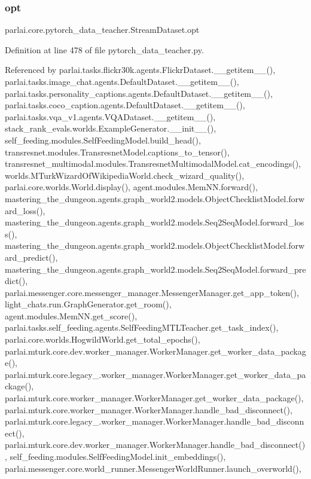 \subsubsection{\texorpdfstring{opt}{opt}}
{\footnotesize\ttfamily parlai.\+core.\+pytorch\+\_\+data\+\_\+teacher.\+Stream\+Dataset.\+opt}



Definition at line 478 of file pytorch\+\_\+data\+\_\+teacher.\+py.



Referenced by parlai.\+tasks.\+flickr30k.\+agents.\+Flickr\+Dataset.\+\_\+\+\_\+getitem\+\_\+\+\_\+(), parlai.\+tasks.\+image\+\_\+chat.\+agents.\+Default\+Dataset.\+\_\+\+\_\+getitem\+\_\+\+\_\+(), parlai.\+tasks.\+personality\+\_\+captions.\+agents.\+Default\+Dataset.\+\_\+\+\_\+getitem\+\_\+\+\_\+(), parlai.\+tasks.\+coco\+\_\+caption.\+agents.\+Default\+Dataset.\+\_\+\+\_\+getitem\+\_\+\+\_\+(), parlai.\+tasks.\+vqa\+\_\+v1.\+agents.\+V\+Q\+A\+Dataset.\+\_\+\+\_\+getitem\+\_\+\+\_\+(), stack\+\_\+rank\+\_\+evals.\+worlds.\+Example\+Generator.\+\_\+\+\_\+init\+\_\+\+\_\+(), self\+\_\+feeding.\+modules.\+Self\+Feeding\+Model.\+build\+\_\+head(), transresnet.\+modules.\+Transresnet\+Model.\+captions\+\_\+to\+\_\+tensor(), transresnet\+\_\+multimodal.\+modules.\+Transresnet\+Multimodal\+Model.\+cat\+\_\+encodings(), worlds.\+M\+Turk\+Wizard\+Of\+Wikipedia\+World.\+check\+\_\+wizard\+\_\+quality(), parlai.\+core.\+worlds.\+World.\+display(), agent.\+modules.\+Mem\+N\+N.\+forward(), mastering\+\_\+the\+\_\+dungeon.\+agents.\+graph\+\_\+world2.\+models.\+Object\+Checklist\+Model.\+forward\+\_\+loss(), mastering\+\_\+the\+\_\+dungeon.\+agents.\+graph\+\_\+world2.\+models.\+Seq2\+Seq\+Model.\+forward\+\_\+loss(), mastering\+\_\+the\+\_\+dungeon.\+agents.\+graph\+\_\+world2.\+models.\+Object\+Checklist\+Model.\+forward\+\_\+predict(), mastering\+\_\+the\+\_\+dungeon.\+agents.\+graph\+\_\+world2.\+models.\+Seq2\+Seq\+Model.\+forward\+\_\+predict(), parlai.\+messenger.\+core.\+messenger\+\_\+manager.\+Messenger\+Manager.\+get\+\_\+app\+\_\+token(), light\+\_\+chats.\+run.\+Graph\+Generator.\+get\+\_\+room(), agent.\+modules.\+Mem\+N\+N.\+get\+\_\+score(), parlai.\+tasks.\+self\+\_\+feeding.\+agents.\+Self\+Feeding\+M\+T\+L\+Teacher.\+get\+\_\+task\+\_\+index(), parlai.\+core.\+worlds.\+Hogwild\+World.\+get\+\_\+total\+\_\+epochs(), parlai.\+mturk.\+core.\+dev.\+worker\+\_\+manager.\+Worker\+Manager.\+get\+\_\+worker\+\_\+data\+\_\+package(), parlai.\+mturk.\+core.\+legacy\+\_.\+worker\+\_\+manager.\+Worker\+Manager.\+get\+\_\+worker\+\_\+data\+\_\+package(), parlai.\+mturk.\+core.\+worker\+\_\+manager.\+Worker\+Manager.\+get\+\_\+worker\+\_\+data\+\_\+package(), parlai.\+mturk.\+core.\+worker\+\_\+manager.\+Worker\+Manager.\+handle\+\_\+bad\+\_\+disconnect(), parlai.\+mturk.\+core.\+legacy\+\_.\+worker\+\_\+manager.\+Worker\+Manager.\+handle\+\_\+bad\+\_\+disconnect(), parlai.\+mturk.\+core.\+dev.\+worker\+\_\+manager.\+Worker\+Manager.\+handle\+\_\+bad\+\_\+disconnect(), self\+\_\+feeding.\+modules.\+Self\+Feeding\+Model.\+init\+\_\+embeddings(), parlai.\+messenger.\+core.\+world\+\_\+runner.\+Messenger\+World\+Runner.\+launch\+\_\+overworld(), 